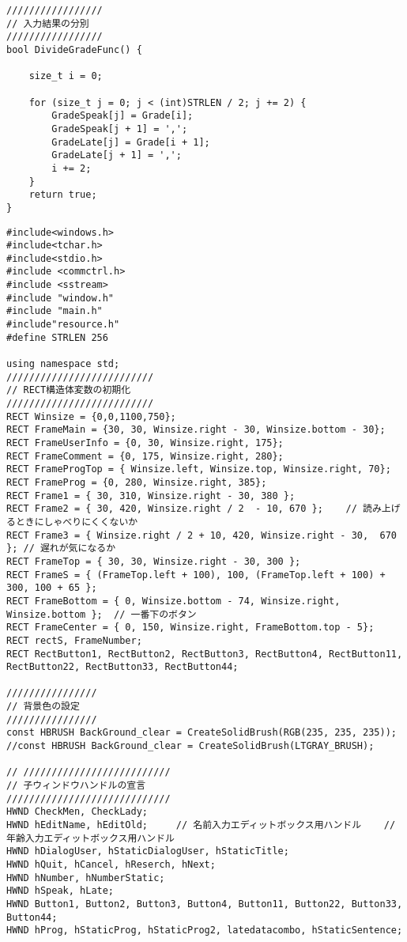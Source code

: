 \begin{lstlisting}[caption=main.cpp]
/////////////////
// 入力結果の分別
/////////////////
bool DivideGradeFunc() {

	size_t i = 0;

	for (size_t j = 0; j < (int)STRLEN / 2; j += 2) {
		GradeSpeak[j] = Grade[i];
		GradeSpeak[j + 1] = ',';
		GradeLate[j] = Grade[i + 1];
		GradeLate[j + 1] = ',';
		i += 2;
	}
	return true;
}

\end{lstlisting}

\begin{lstlisting}[caption=window.cpp]
#include<windows.h>
#include<tchar.h>
#include<stdio.h>
#include <commctrl.h> 
#include <sstream>
#include "window.h"
#include "main.h"
#include"resource.h"
#define STRLEN 256

using namespace std;
//////////////////////////
// RECT構造体変数の初期化
//////////////////////////
RECT Winsize = {0,0,1100,750};
RECT FrameMain = {30, 30, Winsize.right - 30, Winsize.bottom - 30};
RECT FrameUserInfo = {0, 30, Winsize.right, 175};
RECT FrameComment = {0, 175, Winsize.right, 280};
RECT FrameProgTop = { Winsize.left, Winsize.top, Winsize.right, 70};
RECT FrameProg = {0, 280, Winsize.right, 385};
RECT Frame1 = { 30, 310, Winsize.right - 30, 380 };
RECT Frame2 = { 30, 420, Winsize.right / 2  - 10, 670 };    // 読み上げるときにしゃべりにくくないか
RECT Frame3 = { Winsize.right / 2 + 10, 420, Winsize.right - 30,  670 }; // 遅れが気になるか
RECT FrameTop = { 30, 30, Winsize.right - 30, 300 };
RECT FrameS = { (FrameTop.left + 100), 100, (FrameTop.left + 100) + 300, 100 + 65 };
RECT FrameBottom = { 0, Winsize.bottom - 74, Winsize.right,  Winsize.bottom };  // 一番下のボタン
RECT FrameCenter = { 0, 150, Winsize.right, FrameBottom.top - 5};
RECT rectS, FrameNumber;
RECT RectButton1, RectButton2, RectButton3, RectButton4, RectButton11, RectButton22, RectButton33, RectButton44;

////////////////
// 背景色の設定
////////////////
const HBRUSH BackGround_clear = CreateSolidBrush(RGB(235, 235, 235));
//const HBRUSH BackGround_clear = CreateSolidBrush(LTGRAY_BRUSH);

// //////////////////////////
// 子ウィンドウハンドルの宣言
/////////////////////////////
HWND CheckMen, CheckLady;      
HWND hEditName, hEditOld;     // 名前入力エディットボックス用ハンドル    // 年齢入力エディットボックス用ハンドル
HWND hDialogUser, hStaticDialogUser, hStaticTitle;
HWND hQuit, hCancel, hReserch, hNext;
HWND hNumber, hNumberStatic;
HWND hSpeak, hLate;
HWND Button1, Button2, Button3, Button4, Button11, Button22, Button33, Button44;
HWND hProg, hStaticProg, hStaticProg2, latedatacombo, hStaticSentence;


\end{lstlisting}
